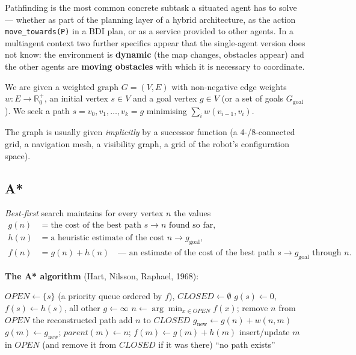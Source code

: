 \documentclass[11pt,a4paper]{article}
\theoremstyle{definition}
\providecommand{\uv}[1]{``#1''}
\begin{document}
Pathfinding is the most common concrete subtask a situated agent has to solve --- whether as part of
the planning layer of a hybrid architecture, as the action \texttt{move\_towards(P)} in a BDI plan, or
as a service provided to other agents.
In a multiagent context two further specifics appear that the single-agent version does not know:
the environment is \textbf{dynamic} (the map changes, obstacles appear) and the other agents are
\textbf{moving obstacles} with which it is necessary to coordinate.

\begin{defbox}
We are given a weighted graph $G = (V,E)$ with non-negative edge weights $w : E \to \mathbb{R}_0^+$,
an initial vertex $s \in V$ and a goal vertex $g \in V$ (or a set of goals $G_{\mathrm{goal}}$).
We seek a path $s = v_0, v_1, \dots, v_k = g$ minimising $\sum_{i} w(v_{i-1},v_i)$.

The graph is usually given \emph{implicitly} by a successor function (a 4-/8-connected grid, a
navigation mesh, a visibility graph, a grid of the robot's configuration space).
\end{defbox}

\subsection{A*}

\emph{Best-first} search maintains for every vertex $n$ the values
\begin{align*}
g(n) &= \text{the cost of the best path } s \to n \text{ found so far}, \\
h(n) &= \text{a heuristic estimate of the cost } n \to g_{\mathrm{goal}}, \\
f(n) &= g(n) + h(n) \quad \text{--- an estimate of the cost of the best path } s \to g_{\mathrm{goal}}
  \text{ through } n .
\end{align*}

\noindent\textbf{The A* algorithm} (Hart, Nilsson, Raphael, 1968):
\begin{algorithmic}[1]
\State $\mathit{OPEN} \gets \{s\}$ (a priority queue ordered by $f$), $\mathit{CLOSED} \gets \emptyset$
\State $g(s) \gets 0$, $f(s) \gets h(s)$, all other $g \gets \infty$
  \State $n \gets \arg\min_{x \in \mathit{OPEN}} f(x)$; remove $n$ from $\mathit{OPEN}$
   \Return the reconstructed path \EndIf
  \State add $n$ to $\mathit{CLOSED}$
    \State $g_{\mathrm{new}} \gets g(n) + w(n,m)$
      \State $g(m) \gets g_{\mathrm{new}}$; $\mathit{parent}(m) \gets n$;
             $f(m) \gets g(m) + h(m)$
      \State insert/update $m$ in $\mathit{OPEN}$ (and remove it from $\mathit{CLOSED}$ if it was there)
    \EndIf
  \EndFor
\EndWhile
\State \Return \uv{no path exists}
\end{algorithmic}
\end{document}
